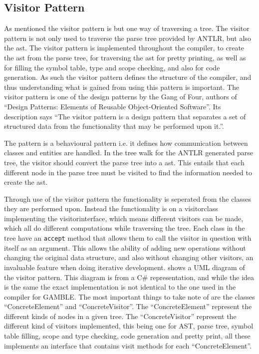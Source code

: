 \subsection*{Visitor Pattern}\label{subs:visit}
As mentioned the visitor pattern is but one way of traversing a tree.
The visitor pattern is not only used to traverse the parse tree provided by ANTLR, but also the \acrfull{ast}.
The visitor pattern is implemented throughout the compiler, to create the \acrfull{ast} from the parse tree, for traversing the \acrfull{ast} for pretty printing, as well as for filling the symbol table, type and scope checking, and also for code generation.
As such the visitor pattern defines the structure of the compiler, and thus understanding what is gained from using this pattern is important.
The visitor pattern is one of the design patterns by the Gang of Four, authors of ``Design Patterns: Elements of Reusable Object-Oriented Software''.
Its description says ``The visitor pattern is a design pattern that separates a set of structured data from the functionality that may be performed upon it.''. \citep{GOF}

The pattern is a behavioural pattern i.e. it defines how communication between classes and entities are handled.
In the tree walk for the ANTLR generated parse tree, the visitor should convert the parse tree into a \acrfull{ast}.
This entails that each different node in the parse tree must be visited to find the information needed to create the \acrfull{ast}.

Through use of the visitor pattern the functionality is seperated from the classes they are performed upon.
Instead the functionality is on a visitorclass implementing the visitorinterface, which means different visitors can be made, which all do different computations while traversing the tree.
Each class in the tree have an \texttt{accept} method that allows them to call the visitor in question with itself as an argument.
This allows the ability of adding new operations without changing the original data structure, and also without changing other visitors, an invaluable feature when doing iterative development.
 shows a UML diagram of the visitor pattern.
This diagram is from a C\# representation, and while the idea is the same the exact implementation is not identical to the one used in the compiler for GAMBLE.
The most important things to take note of are the classes ``ConcreteElement'' and ``ConcreteVisitor''.
The ``ConcreteElement'' represent the different kinds of nodes in a given tree.
The ``ConcreteVisitor'' represent the different kind of visitors implemented, this being one for AST, parse tree, symbol table filling, scope and type checking, code generation and pretty print, all these implements an interface that contains visit methods for each ``ConcreteElement''.

